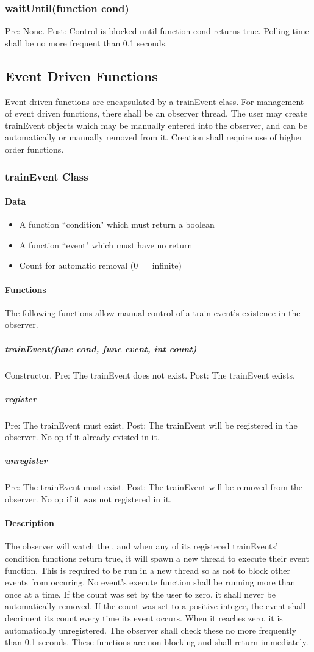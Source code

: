 \documentclass[a4paper,11pt,notitlepage]{article}
\begin{document}
\subsubsection{waitUntil(function cond)} Pre: None. Post: Control is blocked until function cond returns true. Polling time shall be no more frequent than 0.1 seconds.

\subsection{Event Driven Functions}
Event driven functions are encapsulated by a trainEvent class. For management of event driven functions, there shall be an observer thread. The user may create trainEvent objects which may be manually entered into the observer, and can be automatically or manually removed from it. Creation shall require use of higher order functions.
\subsubsection{trainEvent Class}
\paragraph{Data}
\begin{itemize}
\item A function ``condition" which must return a boolean
\item A function ``event" which must have no return
\item Count for automatic removal ($0 =$ infinite)
\end{itemize}
\paragraph{Functions}
The following functions allow manual control of a train event's existence in the observer.
\subparagraph{trainEvent(func cond, func event, int count)} Constructor. Pre: The trainEvent does not exist. Post: The trainEvent exists.
\subparagraph{register} Pre: The trainEvent must exist. Post: The trainEvent will be registered in the observer. No op if it already existed in it.
\subparagraph{unregister} Pre: The trainEvent must exist. Post: The trainEvent will be removed from the observer. No op if it was not registered in it.
\paragraph{Description}
The observer will watch the \LC, and when any of its registered trainEvents' condition functions return true, it will spawn a new thread to execute their event function. This is required to be run in a new thread so as not to block other events from occuring. No event's execute function shall be running more than once at a time. If the count was set by the user to zero, it shall never be automatically removed. If the count was set to a positive integer, the event shall decriment its count every time its event occurs. When it reaches zero, it is automatically unregistered. The observer shall check these no more frequently than 0.1 seconds.
These functions are non-blocking and shall return immediately.
\end{document}
